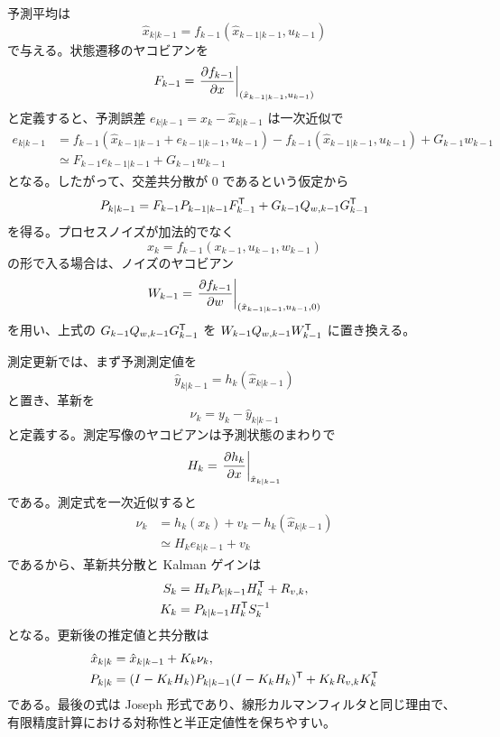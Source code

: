 予測平均は
\begin{equation}
  \hat{x}_{k|k-1}
  =f_{k-1}(\hat{x}_{k-1|k-1},u_{k-1})
\end{equation}
で与える。状態遷移のヤコビアンを
\begin{equation}
  F_{k-1}
  =
  \left.\frac{\partial f_{k-1}}{\partial x}\right|_{(\hat{x}_{k-1|k-1},u_{k-1})}
\end{equation}
と定義すると、予測誤差 $e_{k|k-1}=x_k-\hat{x}_{k|k-1}$ は一次近似で
\begin{align}
  e_{k|k-1}
  &=f_{k-1}(\hat{x}_{k-1|k-1}+e_{k-1|k-1},u_{k-1})
    -f_{k-1}(\hat{x}_{k-1|k-1},u_{k-1})
    +G_{k-1}w_{k-1}\\
  &\simeq F_{k-1}e_{k-1|k-1}+G_{k-1}w_{k-1}
\end{align}
となる。したがって、交差共分散が 0 であるという仮定から
\begin{equation}
  P_{k|k-1}
  =
  F_{k-1}P_{k-1|k-1}F_{k-1}^{\mathsf{T}}
  +G_{k-1}Q_{w,k-1}G_{k-1}^{\mathsf{T}}
\end{equation}
を得る。プロセスノイズが加法的でなく
\begin{equation}
  x_k=f_{k-1}(x_{k-1},u_{k-1},w_{k-1})
\end{equation}
の形で入る場合は、ノイズのヤコビアン
\begin{equation}
  W_{k-1}
  =
  \left.\frac{\partial f_{k-1}}{\partial w}\right|_{(\hat{x}_{k-1|k-1},u_{k-1},0)}
\end{equation}
を用い、上式の $G_{k-1}Q_{w,k-1}G_{k-1}^{\mathsf{T}}$ を $W_{k-1}Q_{w,k-1}W_{k-1}^{\mathsf{T}}$ に置き換える。

測定更新では、まず予測測定値を
\begin{equation}
  \hat{y}_{k|k-1}=h_k(\hat{x}_{k|k-1})
\end{equation}
と置き、革新を
\begin{equation}
  \nu_k=y_k-\hat{y}_{k|k-1}
\end{equation}
と定義する。測定写像のヤコビアンは予測状態のまわりで
\begin{equation}
  H_k=
  \left.\frac{\partial h_k}{\partial x}\right|_{\hat{x}_{k|k-1}}
\end{equation}
である。測定式を一次近似すると
\begin{align}
  \nu_k
  &=h_k(x_k)+v_k-h_k(\hat{x}_{k|k-1})\\
  &\simeq H_ke_{k|k-1}+v_k
\end{align}
であるから、革新共分散と Kalman ゲインは
\begin{align}
  S_k&=H_kP_{k|k-1}H_k^{\mathsf{T}}+R_{v,k},\\
  K_k&=P_{k|k-1}H_k^{\mathsf{T}} S_k^{-1}
\end{align}
となる。更新後の推定値と共分散は
\begin{align}
  \hat{x}_{k|k}
  &=\hat{x}_{k|k-1}+K_k\nu_k,\\
  P_{k|k}
  &=(I-K_kH_k)P_{k|k-1}(I-K_kH_k)^{\mathsf{T}}
    +K_kR_{v,k}K_k^{\mathsf{T}}
\end{align}
である。最後の式は Joseph 形式であり、線形カルマンフィルタと同じ理由で、有限精度計算における対称性と半正定値性を保ちやすい。

